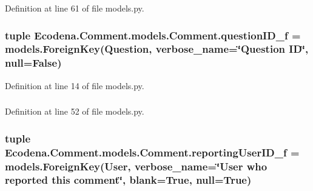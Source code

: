 Definition at line 61 of file models.py.

\hypertarget{class_ecodena_1_1_comment_1_1models_1_1_comment_a2c6b11a35fd421d384666c0b79a20c47}{
\subsubsection[{questionID\_\-f}]{\setlength{\rightskip}{0pt plus 5cm}tuple {\bf Ecodena.Comment.models.Comment.questionID\_\-f} = models.ForeignKey({\bf Question}, verbose\_\-name=\char`\"{}Question ID\char`\"{}, null=False)}}
\label{d9/d86/class_ecodena_1_1_comment_1_1models_1_1_comment_a2c6b11a35fd421d384666c0b79a20c47}


Definition at line 14 of file models.py.

\hypertarget{class_ecodena_1_1_comment_1_1models_1_1_comment_ad01a59e4f30cca2bde7b205e47091ffc}{
\subsubsection[{reportingUserID\_\-f}]{}}
\label{d9/d86/class_ecodena_1_1_comment_1_1models_1_1_comment_ad01a59e4f30cca2bde7b205e47091ffc}


Definition at line 52 of file models.py.

\hypertarget{class_ecodena_1_1_comment_1_1models_1_1_comment_a8eec9726cc1a3667ec0808b1678ce93e}{
\subsubsection[{reportingUserID\_\-f}]{\setlength{\rightskip}{0pt plus 5cm}tuple {\bf Ecodena.Comment.models.Comment.reportingUserID\_\-f} = models.ForeignKey(User, verbose\_\-name=\char`\"{}User who reported this comment\char`\"{}, blank=True, null=True)}}
\label{d9/d86/class_ecodena_1_1_comment_1_1models_1_1_comment_a8eec9726cc1a3667ec0808b1678ce93e}


